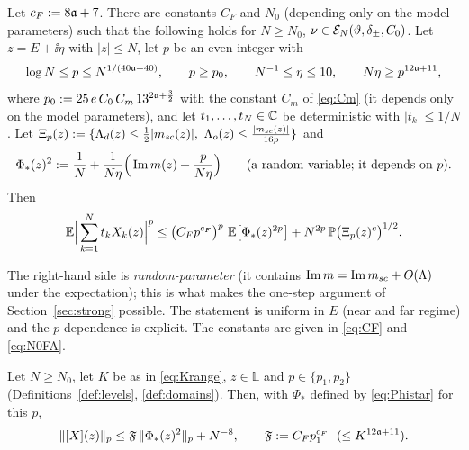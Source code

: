 \begin{theorem}\label{thm:FA}
Let $c_F:=8\mathfrak{a}+7$. There are constants $C_F$ and $N_0$ (depending only on the model parameters) such that the following holds for $N\ge N_0$, $\nu\in\mathcal E_N(\vartheta,\delta_\pm,C_0)$.
Let $z=E+\ii\eta$ with $|z|\le N$, let $p$ be an even integer with
\begin{equation}\label{eq:FAhyp}
 \log N\le p\le N^{1/(40\mathfrak{a}+40)},\qquad p\ge p_0,\qquad N^{-1}\le\eta\le10,\qquad N\eta\ge p^{12\mathfrak{a}+11},
\end{equation}
where $p_0:=25\,e\,C_0\,C_m\,13^{2\mathfrak{a}+\frac32}$ with the constant $C_m$ of \eqref{eq:Cm} (it depends only on the model parameters),
and let $t_1,\dots,t_N\in\mathbb{C}$ be deterministic with $|t_k|\le1/N$. Let
$\Xi_p(z):=\{\Ld(z)\le\frac12|\msc(z)|,\ \Lo(z)\le\frac{|\msc(z)|}{16p}\}$ and
\begin{equation}\label{eq:Phistar}
 \Phi_*(z)^2:=\frac1N+\frac1{N\eta}\Big(\operatorname{Im} m(z)+\frac{p}{N\eta}\Big)\qquad(\text{a random variable; it depends on }p).
\end{equation}
Then
\begin{equation}\label{eq:FA}
 \EE\Big|\sum_{k=1}^Nt_kX_k(z)\Big|^p\le\big(C_Fp^{c_F}\big)^p\ \EE\big[\Phi_*(z)^{2p}\big]+N^{2p}\,\PP\big(\Xi_p(z)^c\big)^{1/2}.
\end{equation}
\end{theorem}
\noindent The right-hand side is \emph{random-parameter} (it contains $\operatorname{Im} m=\operatorname{Im}m_{sc}+O(\Lambda)$ under the expectation); this is what makes the one-step argument of Section~\ref{sec:strong} possible.
The statement is uniform in $E$ (near and far regime) and the $p$-dependence is explicit. The constants are given in \eqref{eq:CF} and \eqref{eq:N0FA}.

\begin{corollary}\label{cor:FA}
Let $N\ge N_0$, let $K$ be as in \eqref{eq:Krange}, $z\in\mathbb L$ and $p\in\{p_1,p_2\}$ (Definitions~\ref{def:levels}, \ref{def:domains}). Then, with $\Phi_*$ defined by \eqref{eq:Phistar} for this $p$,
\[
 \|[X](z)\|_p\le\mathfrak F\,\|\Phi_*(z)^2\|_p+N^{-8},\qquad\mathfrak F:=C_Fp_1^{c_F}\ \ (\le K^{12\mathfrak{a}+11}).
\]
\end{corollary}

